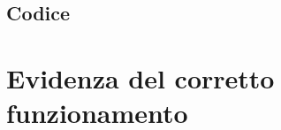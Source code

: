 \documentclass[a4paper]{article}
\begin{document}
\subsection{Codice}








\section{Evidenza del corretto funzionamento}

\end{document}
